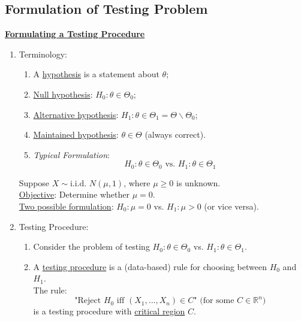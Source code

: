 \documentclass[11pt]{elegantbook}
\begin{document}
\subsection{Formulation of Testing Problem}
\textbf{\underline{Formulating a Testing Procedure}}
\begin{enumerate}[$\bullet$]
    \item Terminology:
    \begin{definition}[Hypothesis]
        \normalfont
        \begin{enumerate}
            \item A \underline{hypothesis} is a statement about $\theta$;
            \item \underline{Null hypothesis}: $H_0: \theta\in \Theta_0$;
            \item \underline{Alternative hypothesis}: $H_1: \theta\in \Theta_1=\Theta\backslash\Theta_0$;
            \item \underline{Maintained hypothesis}: $\theta\in \Theta$ (always correct).
            \item \textit{Typical Formulation}: $$H_0: \theta\in \Theta_0 \text{ vs. } H_1: \theta\in \Theta_1$$
        \end{enumerate}
    \end{definition}
    \begin{example}
        Suppose $X\sim \text{i.i.d. } N(\mu,1)$, where $\mu\geq 0$ is unknown.\\
        \underline{Objective}: Determine whether $\mu=0$.\\
        \underline{Two possible formulation}: $H_0:\mu=0$ vs. $H_1:\mu> 0$ (or vice versa).
    \end{example}
    \item Testing Procedure:
    \begin{enumerate}
        \item[] Consider the problem of testing $H_0:\theta\in \Theta_0$ vs. $H_1:\theta\in \Theta_1$.
        \item[]
        \begin{definition}
            \normalfont
            A \underline{testing procedure} is a (data-based) rule for choosing between $H_0$ and $H_1$.\\
            The rule: $$\text{"Reject $H_0$ iff $(X_1,...,X_n)\in C$" (for some $C\in \mathbb{R}^n$)}$$ is a testing procedure with \underline{critical region} $C$.
        \end{definition}

\end{enumerate}
\end{enumerate}
\end{document}
